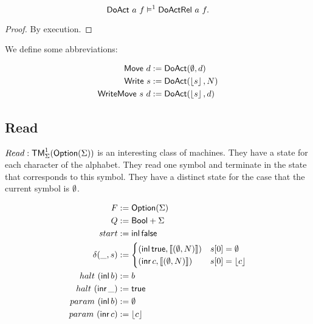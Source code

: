 \begin{lemma}
  \label{lem:tam}
  ~
  \[
    \textsf{DoAct}~a~f \vDash^1 \textsf{DoActRel}~a~f.
  \]

\end{lemma}
\begin{proof}
  By execution.
\end{proof}


We define some abbreviations:

\begin{definition}
 \label{def:DoAct-derived} 

 \begin{align*}
   \textsf{Move}       ~d &:= \textsf{DoAct} (\emptyset, d) \\
   \textsf{Write}    ~s   &:= \textsf{DoAct} (\left\lfloor {s}\right\rfloor, N) \\
   \textsf{WriteMove}~s~d &:= \textsf{DoAct} (\left\lfloor {s}\right\rfloor, d)
 \end{align*}
 
\end{definition}



\subsection{Read}
\label{sec:basic_machines-Read}

$Read : \textsf{TM}_\Sigma^1(\textsf{Option}(\Sigma))$ is an interesting class of machines.  They have a state for each character of the alphabet.  They read one
symbol and terminate in the state that corresponds to this symbol.  They have a distinct state for the case that the current symbol is $\emptyset$.


\begin{definition}[$\MS{Read}$]
  \begin{align*}
    F          &:= \textsf{Option}(\Sigma) \\
    Q          &:= \textsf{Bool}+\Sigma \\
    start      &:= \operatorname{\textsf{inl}} \textsf{false} \\
    \delta (\_, s) &:=
                     \begin{cases}
                       (\operatorname{\textsf{inl}} \textsf{true}, \left\llbracket (\emptyset, N) \right\rrbracket) & s[0] = \emptyset \\
                       (\operatorname{\textsf{inr}} c, \left\llbracket (\emptyset, N) \right\rrbracket)     & s[0] = \left\lfloor {c}\right\rfloor
                     \end{cases} \\
    halt   ~ (\operatorname{\textsf{inl}}  b) &:= b \\
    halt   ~ (\operatorname{\textsf{inr}} \_) &:= \textsf{true} \\
    param  ~ (\operatorname{\textsf{inl}}  b) &:= \emptyset \\
    param  ~ (\operatorname{\textsf{inr}}  c) &:= \left\lfloor {c}\right\rfloor
  \end{align*}
\end{definition}


